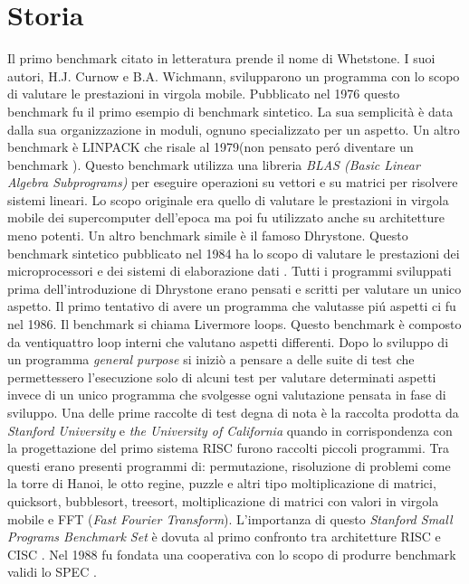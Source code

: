 \documentclass[12pt, a4paper]{report}
\begin{document}
\section{Storia}
Il primo benchmark citato in letteratura prende il nome di Whetstone. I suoi autori, H.J. Curnow e B.A. Wichmann, svilupparono un programma con lo scopo di valutare le prestazioni in virgola mobile. Pubblicato nel 1976 questo benchmark fu il primo esempio di benchmark sintetico. La sua semplicità è data dalla sua organizzazione in moduli, ognuno specializzato per un aspetto.
 Un altro benchmark è LINPACK che risale al 1979(non pensato per\'o diventare un benchmark ). Questo benchmark utilizza una libreria \textit{BLAS (Basic Linear Algebra Subprograms) } per eseguire operazioni su vettori e su matrici per risolvere sistemi lineari. Lo scopo originale era quello di valutare le prestazioni in virgola mobile dei supercomputer dell'epoca ma poi fu utilizzato anche su architetture meno potenti\cite{LinpackSite}.
 Un altro benchmark simile è il famoso Dhrystone. Questo benchmark sintetico pubblicato nel 1984 ha lo scopo di valutare le prestazioni dei microprocessori e dei sistemi di elaborazione dati \cite{DhrystoneWP}.
 Tutti i programmi sviluppati prima dell'introduzione di Dhrystone erano pensati e scritti per valutare un unico aspetto. Il primo tentativo di avere un programma che valutasse pi\'u aspetti ci fu nel 1986. Il benchmark si chiama Livermore loops. Questo benchmark è composto da ventiquattro loop interni che valutano aspetti differenti. 
 Dopo lo sviluppo di un programma \textit{general purpose} si iniziò a pensare a delle suite di test che permettessero l'esecuzione solo di alcuni test per valutare determinati aspetti invece di un unico programma che svolgesse ogni valutazione pensata in fase di sviluppo.
Una delle prime raccolte di test degna di nota è la raccolta prodotta da \textit{Stanford University} e \textit{the University of California} quando in corrispondenza con la progettazione del primo sistema RISC furono raccolti piccoli programmi. Tra questi erano presenti programmi di: permutazione,  risoluzione di problemi come la torre di Hanoi, le otto regine,  puzzle e altri tipo moltiplicazione di matrici, quicksort, bubblesort, treesort, moltiplicazione di matrici con valori in virgola mobile e FFT (\textit{Fast Fourier Transform}).  L'importanza di questo \textit{Stanford Small Programs Benchmark Set} è dovuta al primo confronto tra architetture RISC e CISC \cite{CommonBench}.
 Nel 1988 fu fondata una cooperativa con lo scopo di produrre benchmark validi lo SPEC \cite{SPECSite}.%
\end{document}
